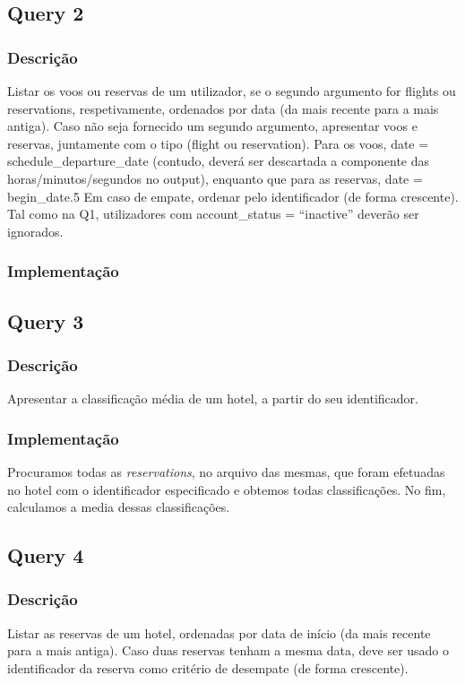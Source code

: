 \documentclass[11pt]{article}
\begin{document}
\subsection{Query 2}
\subsubsection{Descrição}
Listar os voos ou reservas de um utilizador, se o segundo argumento for flights ou reservations,
respetivamente, ordenados por data (da mais recente para a mais antiga). Caso não seja fornecido
um segundo argumento, apresentar voos e reservas, juntamente com o tipo (flight ou reservation).
Para os voos, date = schedule_departure_date (contudo, deverá ser descartada a componente das
horas/minutos/segundos no output), enquanto que para as reservas, date = begin_date.5 Em caso
de empate, ordenar pelo identificador (de forma crescente). Tal como na Q1, utilizadores com
account_status = “inactive” deverão ser ignorados.

    
\subsubsection{Implementação}

 

\newpage
\subsection{Query 3}
\subsubsection{Descrição}
Apresentar a classificação média de um hotel, a partir do seu identificador.

\subsubsection{Implementação}
Procuramos todas as \textit{reservations}, no arquivo das mesmas, que foram efetuadas no hotel com o identificador especificado e obtemos todas classificações. No fim, calculamos a media dessas classificações.

\subsection{Query 4}
\subsubsection{Descrição}
Listar as reservas de um hotel, ordenadas por data de início (da mais recente para a mais
antiga). Caso duas reservas tenham a mesma data, deve ser usado o identificador da reserva como
critério de desempate (de forma crescente).
\end{document}
